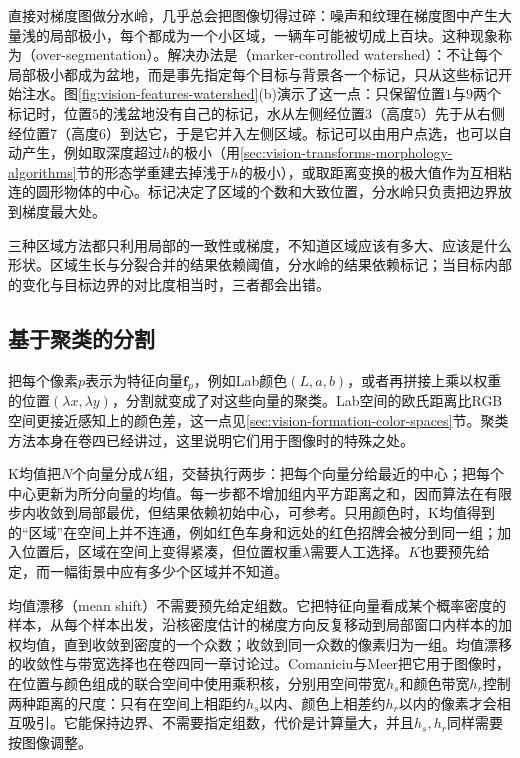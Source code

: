 直接对梯度图做分水岭，几乎总会把图像切得过碎：噪声和纹理在梯度图中产生大量浅的局部极小，每个都成为一个小区域，一辆车可能被切成上百块。这种现象称为（over-segmentation）。解决办法是（marker-controlled watershed）：不让每个局部极小都成为盆地，而是事先指定每个目标与背景各一个标记，只从这些标记开始注水。图\ref{fig:vision-features-watershed}(b)演示了这一点：只保留位置$1$与$9$两个标记时，位置$5$的浅盆地没有自己的标记，水从左侧经位置$3$（高度$5$）先于从右侧经位置$7$（高度$6$）到达它，于是它并入左侧区域。标记可以由用户点选，也可以自动产生，例如取深度超过$h$的极小（用\ref{sec:vision-transforms-morphology-algorithms}节的形态学重建去掉浅于$h$的极小），或取距离变换的极大值作为互相粘连的圆形物体的中心。标记决定了区域的个数和大致位置，分水岭只负责把边界放到梯度最大处。

三种区域方法都只利用局部的一致性或梯度，不知道区域应该有多大、应该是什么形状。区域生长与分裂合并的结果依赖阈值，分水岭的结果依赖标记；当目标内部的变化与目标边界的对比度相当时，三者都会出错。

\subsection{基于聚类的分割}
\label{sec:vision-features-clustering-segmentation}
\label{sec:vision-features-superpixel}

把每个像素$p$表示为特征向量$\bm f_p$，例如Lab颜色$(L,a,b)$，或者再拼接上乘以权重的位置$(\lambda x,\lambda y)$，分割就变成了对这些向量的聚类。Lab空间的欧氏距离比RGB空间更接近感知上的颜色差，这一点见\ref{sec:vision-formation-color-spaces}节。聚类方法本身在卷四已经讲过，这里说明它们用于图像时的特殊之处。

K均值把$N$个向量分成$K$组，交替执行两步：把每个向量分给最近的中心；把每个中心更新为所分向量的均值。每一步都不增加组内平方距离之和，因而算法在有限步内收敛到局部最优，但结果依赖初始中心，可参考。只用颜色时，K均值得到的“区域”在空间上并不连通，例如红色车身和远处的红色招牌会被分到同一组；加入位置后，区域在空间上变得紧凑，但位置权重$\lambda$需要人工选择。$K$也要预先给定，而一幅街景中应有多少个区域并不知道。

均值漂移（mean shift）不需要预先给定组数。它把特征向量看成某个概率密度的样本，从每个样本出发，沿核密度估计的梯度方向反复移动到局部窗口内样本的加权均值，直到收敛到密度的一个众数；收敛到同一众数的像素归为一组。均值漂移的收敛性与带宽选择也在卷四同一章讨论过。Comaniciu与Meer把它用于图像时，在位置与颜色组成的联合空间中使用乘积核，分别用空间带宽$h_s$和颜色带宽$h_r$控制两种距离的尺度：只有在空间上相距约$h_s$以内、颜色上相差约$h_r$以内的像素才会相互吸引。它能保持边界、不需要指定组数，代价是计算量大，并且$h_s,h_r$同样需要按图像调整。

